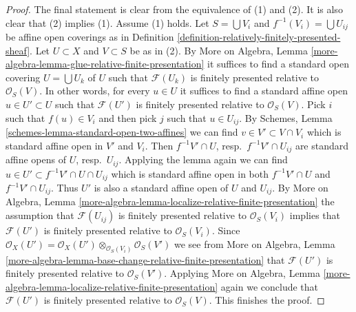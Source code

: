 \documentclass[10pt,a4paper]{amsart}
\theoremstyle{plain}
\theoremstyle{definition}
\theoremstyle{remark}
\numberwithin{equation}{subsection}
\begin{document}
\begin{proof}
The final statement is clear from the equivalence of (1) and (2).
It is also clear that (2) implies (1). Assume (1) holds.
Let $S = \bigcup V_i$ and $f^{-1}(V_i) = \bigcup U_{ij}$ be
affine open coverings as in
Definition \ref{definition-relatively-finitely-presented-sheaf}.
Let $U \subset X$ and $V \subset S$ be as in (2).
By More on Algebra, Lemma
\ref{more-algebra-lemma-glue-relative-finite-presentation}
it suffices to find a standard open covering $U = \bigcup U_k$ of $U$
such that $\mathcal{F}(U_k)$ is finitely presented relative to
$\mathcal{O}_S(V)$. In other words, for every $u \in U$ it suffices
to find a standard affine open $u \in U' \subset U$ such that
$\mathcal{F}(U')$ is finitely presented relative to $\mathcal{O}_S(V)$.
Pick $i$ such that $f(u) \in V_i$ and then pick $j$ such that
$u \in U_{ij}$. By
Schemes, Lemma \ref{schemes-lemma-standard-open-two-affines}
we can find $v \in V' \subset V \cap V_i$ which is standard affine
open in $V'$ and $V_i$. Then $f^{-1}V'  \cap U$, resp.\ $f^{-1}V' \cap U_{ij}$
are standard affine opens of $U$, resp.\ $U_{ij}$.
Applying the lemma again we can find
$u \in U' \subset f^{-1}V' \cap U \cap U_{ij}$ which is standard affine
open in both $f^{-1}V'  \cap U$ and $f^{-1}V' \cap U_{ij}$.
Thus $U'$ is also a standard affine open of $U$ and $U_{ij}$.
By More on Algebra, Lemma
\ref{more-algebra-lemma-localize-relative-finite-presentation}
the assumption that $\mathcal{F}(U_{ij})$ is finitely presented
relative to $\mathcal{O}_S(V_i)$ implies that
$\mathcal{F}(U')$ is finitely presented relative to $\mathcal{O}_S(V_i)$.
Since $\mathcal{O}_X(U') =
\mathcal{O}_X(U') \otimes_{\mathcal{O}_S(V_i)} \mathcal{O}_S(V')$
we see from More on Algebra, Lemma
\ref{more-algebra-lemma-base-change-relative-finite-presentation}
that $\mathcal{F}(U')$ is finitely presented relative to $\mathcal{O}_S(V')$.
Applying More on Algebra, Lemma
\ref{more-algebra-lemma-localize-relative-finite-presentation}
again we conclude that
$\mathcal{F}(U')$ is finitely presented relative to $\mathcal{O}_S(V)$.
This finishes the proof.
\end{proof}
\end{document}
